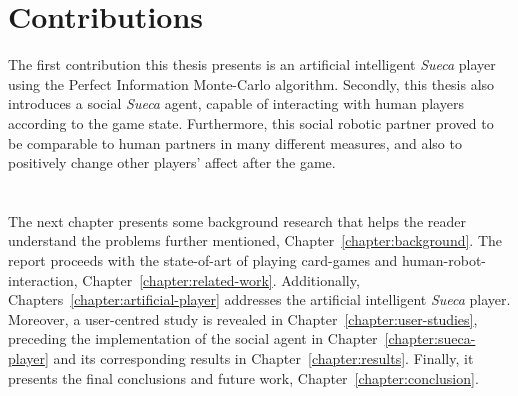 \section*{Contributions}
The first contribution this thesis presents is an artificial intelligent \emph{Sueca} player using the Perfect Information Monte-Carlo algorithm.
Secondly, this thesis also introduces a social \emph{Sueca} agent, capable of interacting with human players according to the game state.
Furthermore, this social robotic partner proved to be comparable to human partners in many different measures, and also to positively change other players' affect after the game.

\section*{\centering*}

The next chapter presents some background research that helps the reader understand the problems further mentioned, Chapter~\ref{chapter:background}.
The report proceeds with the state-of-art of playing card-games and human-robot-interaction, Chapter~\ref{chapter:related-work}.
Additionally, Chapters~\ref{chapter:artificial-player} addresses the artificial intelligent \emph{Sueca} player.
Moreover, a user-centred study is revealed in Chapter~\ref{chapter:user-studies}, preceding the implementation of the social agent in Chapter~\ref{chapter:sueca-player} and its corresponding results in Chapter~\ref{chapter:results}.
Finally, it presents the final conclusions and future work, Chapter~\ref{chapter:conclusion}.
